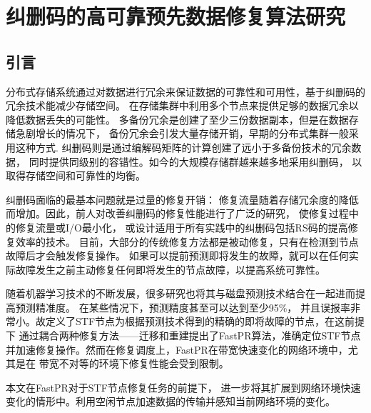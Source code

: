 \chapter{纠删码的高可靠预先数据修复算法研究}







\section{引言}

分布式存储系统通过对数据进行冗余来保证数据的可靠性和可用性，基于纠删码的冗余技术能减少存储空间。
在存储集群中利用多个节点来提供足够的数据冗余以降低数据丢失的可能性。
多备份冗余是创建了至少三份数据副本，但是在数据存储急剧增长的情况下，
备份冗余会引发大量存储开销，早期的分布式集群一般采用这种方式.
纠删码则是通过编解码矩阵的计算创建了远小于多备份技术的冗余数据，
同时提供同级别的容错性\cite{weatherspoon2002erasure}。如今的大规模存储群越来越多地采用纠删码\cite{ford2010availability,huang2012erasure,muralidhar2014f4,ovsiannikov2013quantcast}，
以取得存储空间和可靠性的均衡。

纠删码面临的最基本问题就是过量的修复开销：
修复流量随着存储冗余度的降低而增加\cite{dimakis2010network}。因此，前人对改善纠删码的修复性能进行了广泛的研究，
使修复过程中的修复流量或I/O最小化\citep{dimakis2010network,huang2012erasure,sathiamoorthy2013xoring}，
或设计适用于所有实践中的纠删码包括RS码的提高修复效率的技术\citep{bhagwan2004total,li2017repair,li2019openec,mitra2016partial,shen2016reconsidering,silberstein2014lazy}。
目前，大部分的传统修复方法都是被动修复，只有在检测到节点故障后才会触发修复操作。
如果可以提前预测即将发生的故障，就可以在任何实际故障发生之前主动修复任何即将发生的节点故障，以提高系统可靠性。

随着机器学习技术的不断发展，很多研究也将其与磁盘预测技术结合在一起进而提高预测精准度。
在某些情况下，预测精度甚至可以达到至少95\%\cite{botezatu2016predicting,li2014hard,mahdisoltani2017proactive,zhu2013proactive}，
并且误报率非常小。故\citet{shen2019fast}定义了STF节点为根据预测技术得到的精确的即将故障的节点，在这前提下
通过耦合两种修复方法——迁移和重建提出了FastPR算法，准确定位STF节点并加速修复操作。然而在修复调度上，FastPR在带宽快速变化的网络环境中，尤其是在
带宽不对等的环境下修复性能会受到限制。

本文在FastPR对于STF节点修复任务的前提下， 进一步将其扩展到网络环境快速变化的情形中。利用空闲节点加速数据的传输并感知当前网络环境的变化。

